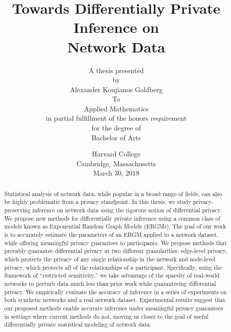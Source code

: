 \documentclass[12pt]{report}
\title{
	Towards Differentially Private Inference on\\ Network Data \\[1.5em]
	}
\author{ 
				A thesis presented  \\[0.1em]
				by\\[1.25em]
				Alexander Koujianos Goldberg \\[1.25em]
				To\\[0.1em]
				Applied Mathematics\\[0.1em]
				in partial fulfillment of the honors requirement\\[0.1em]
				for the degree of\\[0.1em]
				Bachelor of Arts
			}
\date{Harvard College\\[0.1em]
	Cambridge, Massachusetts\\[0.1em]
	March 30, 2018}
\begin{document}
	
	\maketitle 
	
	\begin{abstract}
		Statistical analysis of network data, while popular in a broad range of fields, can also be highly problematic from a privacy standpoint. In this thesis, we study privacy-preserving inference on network data using the rigorous notion of differential privacy. We propose new methods for differentially private inference using a common class of models known as Exponential Random Graph Models (ERGMs). The goal of our work is to accurately estimate the parameters of an ERGM applied to a network dataset, while offering meaningful privacy guarantees to participants. We propose methods that provably guarantee differential privacy at two different granularities: edge-level privacy, which protects the privacy of any single relationship in the network and node-level privacy, which protects all of the relationships of a participant. Specifically, using the framework of ``restricted sensitivity,'' we take advantage of the sparsity of real-world networks to perturb data much less than prior work while guaranteeing differential privacy. We empirically evaluate the accuracy of inference in a series of experiments on both synthetic networks and a real network dataset. Experimental results suggest that our proposed methods enable accurate inference under meaningful privacy guarantees in settings where current methods do not, moving us closer to the goal of useful differentially private statistical modeling of network data. %
	\end{abstract}
\end{document}
